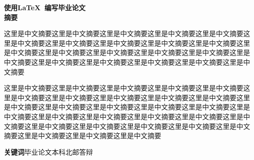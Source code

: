 \begin{center}
  {\bf\heiti{}使用\LaTeX~编写毕业论文}\\[1em]
  {\bf\heiti{}
  摘\quad 要}
\end{center}

这里是中文摘要这里是中文摘要这里是中文摘要这里是中文摘要这里是中文摘要这里是中文摘要这里是中文摘要这里是中文摘要这里是中文摘要这里是中文摘要这里是中文摘要这里是中文摘要这里是中文摘要这里是中文摘要这里是中文摘要这里是中文摘要这里是中文摘要这里是中文摘要这里是中文摘要这里是中文摘要这里是中文摘要

这里是中文摘要这里是中文摘要这里是中文摘要这里是中文摘要这里是中文摘要这里是中文摘要这里是中文摘要这里是中文摘要这里是中文摘要这里是中文摘要这里是中文摘要这里是中文摘要这里是中文摘要这里是中文摘要这里是中文摘要这里是中文摘要这里是中文摘要这里是中文摘要这里是中文摘要这里是中文摘要这里是中文摘要这里是中文摘要这里是中文摘要这里是中文摘要这里是中文摘要这里是中文摘要这里是中文摘要这里是中文摘要这里是中文摘要

\begin{flushleft}
  {\bf\heiti{}关键词}{\quad\songti{}毕业论文\quad 本科\quad 北邮\quad 答辩}
\end{flushleft}

\clearpage
